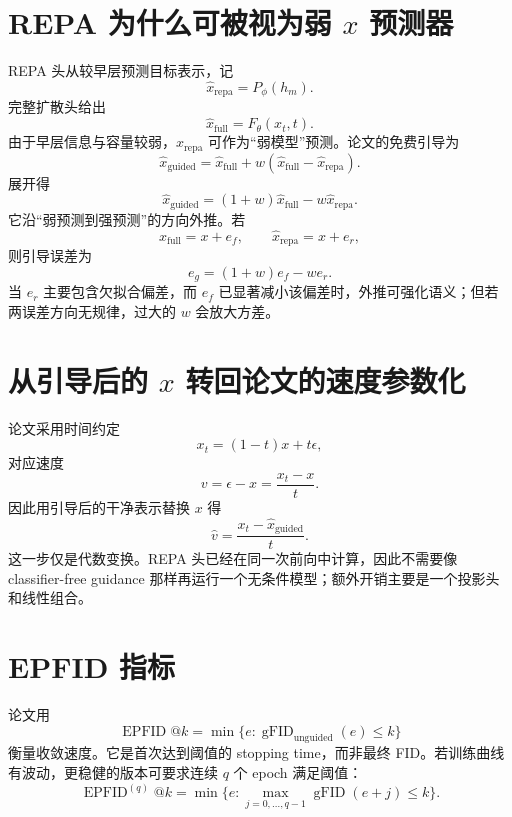 \documentclass[UTF8,12pt,a4paper,fontset=none]{ctexart}
\numberwithin{equation}{section}
\begin{document}
\section{REPA 为什么可被视为弱 $x$ 预测器}
REPA 头从较早层预测目标表示，记
\begin{equation}
 \widehat x_{\mathrm{repa}}=P_\phi(h_m).
\end{equation}
完整扩散头给出
\begin{equation}
 \widehat x_{\mathrm{full}}=F_\theta(x_t,t).
\end{equation}
由于早层信息与容量较弱，$\widehat x_{\mathrm{repa}}$ 可作为“弱模型”预测。论文的免费引导为
\begin{equation}
 \boxed{
 \widehat x_{\mathrm{guided}}
 =\widehat x_{\mathrm{full}}
 +w(\widehat x_{\mathrm{full}}-\widehat x_{\mathrm{repa}}).
 }
\end{equation}
展开得
\begin{equation}
 \widehat x_{\mathrm{guided}}
 =(1+w)\widehat x_{\mathrm{full}}-w\widehat x_{\mathrm{repa}}.
\end{equation}
它沿“弱预测到强预测”的方向外推。若
\begin{equation}
 \widehat x_{\mathrm{full}}=x+e_f,
 \qquad
 \widehat x_{\mathrm{repa}}=x+e_r,
\end{equation}
则引导误差为
\begin{equation}
 e_g=(1+w)e_f-we_r.
\end{equation}
当 $e_r$ 主要包含欠拟合偏差，而 $e_f$ 已显著减小该偏差时，外推可强化语义；但若两误差方向无规律，过大的 $w$ 会放大方差。

\section{从引导后的 $x$ 转回论文的速度参数化}
论文采用时间约定
\begin{equation}
 x_t=(1-t)x+t\epsilon,
\end{equation}
对应速度
\begin{equation}
 v=\epsilon-x=\frac{x_t-x}{t}.
\end{equation}
因此用引导后的干净表示替换 $x$ 得
\begin{equation}
 \boxed{
 \widehat v
 =\frac{x_t-\widehat x_{\mathrm{guided}}}{t}.
 }
\end{equation}
这一步仅是代数变换。REPA 头已经在同一次前向中计算，因此不需要像 classifier-free guidance 那样再运行一个无条件模型；额外开销主要是一个投影头和线性组合。

\section{EPFID 指标}
论文用
\begin{equation}
 \operatorname{EPFID}@k
 =\min\{e:\operatorname{gFID}_{\mathrm{unguided}}(e)\le k\}
\end{equation}
衡量收敛速度。它是首次达到阈值的 stopping time，而非最终 FID。若训练曲线有波动，更稳健的版本可要求连续 $q$ 个 epoch 满足阈值：
\begin{equation}
 \operatorname{EPFID}^{(q)}@k
 =\min\{e:\max_{j=0,\ldots,q-1}\operatorname{gFID}(e+j)\le k\}.
\end{equation}
\end{document}
